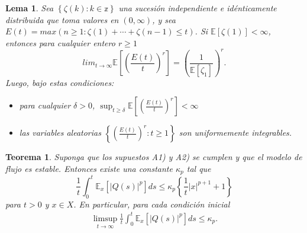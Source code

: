 \documentclass{article}
\newtheorem{Teo}{Teorema}[section]
\newtheorem{Lemma}{Lema}[section]
\newcommand{\esp}{\mathbb{E}}
\numberwithin{equation}{section}
\begin{document}
\begin{Lemma}\label{Lema.5.2}
 Sea $\left\{\zeta\left(k\right):k\in \mathbb{z}\right\}$ una sucesi\'on independiente e id\'enticamente distribuida que toma valores en $\left(0,\infty\right)$,
y sea
$E\left(t\right)=max\left(n\geq1:\zeta\left(1\right)+\cdots+\zeta\left(n-1\right)\leq
t\right)$. Si $\esp\left[\zeta\left(1\right)\right]<\infty$,
entonces para cualquier entero $r\geq1$
\begin{equation}
 lim_{t\rightarrow\infty}\esp\left[\left(\frac{E\left(t\right)}{t}\right)^{r}\right]=\left(\frac{1}{\esp\left[\zeta_{1}\right]}\right)^{r}.
\end{equation}
Luego, bajo estas condiciones:
\begin{itemize}
 \item[a)] para cualquier $\delta>0$, $\sup_{t\geq\delta}\esp\left[\left(\frac{E\left(t\right)}{t}\right)^{r}\right]<\infty$
\item[b)] las variables aleatorias
$\left\{\left(\frac{E\left(t\right)}{t}\right)^{r}:t\geq1\right\}$
son uniformemente integrables.
\end{itemize}
\end{Lemma}

\begin{Teo}\label{Tma.5.5}
Suponga que los supuestos A1) y A2) se cumplen y que el modelo de
flujo es estable. Entonces existe una constante $\kappa_{p}$ tal
que
\begin{equation}
\frac{1}{t}\int_{0}^{t}\esp_{x}\left[|Q\left(s\right)|^{p}\right]ds\leq\kappa_{p}\left\{\frac{1}{t}|x|^{p+1}+1\right\}
\end{equation}
para $t>0$ y $x\in X$. En particular, para cada condici\'on inicial
\begin{eqnarray*}
\limsup_{t\rightarrow\infty}\frac{1}{t}\int_{0}^{t}\esp_{x}\left[|Q\left(s\right)|^{p}\right]ds\leq\kappa_{p}.
\end{eqnarray*}
\end{Teo}
\end{document}
